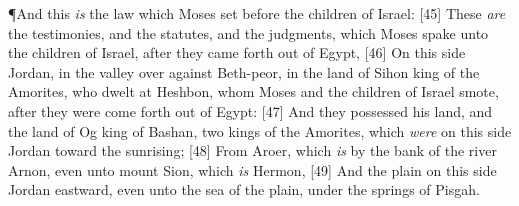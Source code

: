 \P \textcolor[cmyk]{0.99998,1,0,0}{And this \emph{is} the law which Moses set before the children of Israel:}
[45] \textcolor[cmyk]{0.99998,1,0,0}{These \emph{are} the testimonies, and the statutes, and the judgments, which Moses spake unto the children of Israel, after they came forth out of Egypt,}
[46] \textcolor[cmyk]{0.99998,1,0,0}{On this side Jordan, in the valley over against Beth-peor, in the land of Sihon king of the Amorites, who dwelt at Heshbon, whom Moses and the children of Israel smote, after they were come forth out of Egypt:}
[47] \textcolor[cmyk]{0.99998,1,0,0}{And they possessed his land, and the land of Og king of Bashan, two kings of the Amorites, which \emph{were} on this side Jordan toward the sunrising;}
[48] \textcolor[cmyk]{0.99998,1,0,0}{From Aroer, which \emph{is} by the bank of the river Arnon, even unto mount Sion, which \emph{is} Hermon,}
[49] \textcolor[cmyk]{0.99998,1,0,0}{And  the plain on this side Jordan eastward, even unto the sea of the plain, under the springs of Pisgah.}